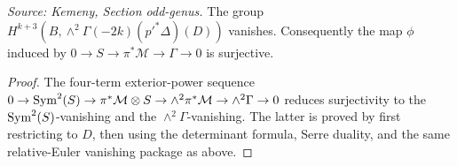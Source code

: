 \begin{proposition}
  \label{prop:kemeny_odd_wedge2_gamma_vanishing}
  \textit{Source: Kemeny, Section odd-genus.}
  The group
  \(H^{k+3}(B,\wedge^2\Gamma(-2k)(p'^*\Delta)(D))\) vanishes.  Consequently the
  map \(\phi\) induced by \(0\to S\to\pi^*\mathcal M\to\Gamma\to0\) is
  surjective.
\end{proposition}
\begin{proof}
  The four-term exterior-power sequence
  \(0\to\mathrm{Sym}^2(S)\to\pi^*\mathcal M\otimes S\to\wedge^2\pi^*\mathcal M
  \to\wedge^2\Gamma\to0\) reduces surjectivity to the \(\mathrm{Sym}^2(S)\)-vanishing
  and the \(\wedge^2\Gamma\)-vanishing.  The latter is proved by first restricting
  to \(D\), then using the determinant formula, Serre duality, and the same
  relative-Euler vanishing package as above.
\end{proof}

